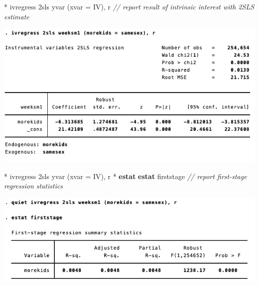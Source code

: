 \documentclass[
  10pt,
  ignorenonframetext,
]{beamer}
\newenvironment{Shaded}{\begin{snugshade}}{\end{snugshade}}
\newcommand{\CommentTok}[1]{\textcolor[rgb]{0.56,0.35,0.01}{\textit{#1}}}
\newcommand{\FunctionTok}[1]{\textcolor[rgb]{0.00,0.00,0.00}{#1}}
\newcommand{\KeywordTok}[1]{\textcolor[rgb]{0.13,0.29,0.53}{\textbf{#1}}}
\newcommand{\NormalTok}[1]{#1}
\begin{document}
\begin{frame}[fragile]{}
\protect\hypertarget{section}{}
\small

\begin{Shaded}
\begin{Highlighting}[]
\NormalTok{* ivregress 2sls yvar (xvar = IV), }\FunctionTok{r}
\CommentTok{// report result of intrinsic interest with 2SLS estimate}
\end{Highlighting}
\end{Shaded}

\begin{center}\includegraphics[width=1\linewidth]{pictures/res3-ivregress} \end{center}
\end{frame}

\begin{frame}[fragile]{}
\protect\hypertarget{section-1}{}
\small

\begin{Shaded}
\begin{Highlighting}[]
\NormalTok{* ivregress 2sls yvar (xvar = IV), }\FunctionTok{r}
\NormalTok{* }\KeywordTok{estat} \KeywordTok{estat}\NormalTok{ firststage}
\CommentTok{// report first{-}stage regression statistics}
\end{Highlighting}
\end{Shaded}

\begin{center}\includegraphics[width=1\linewidth]{pictures/res4-estatFirstStage} \end{center}
\end{frame}
\end{document}
